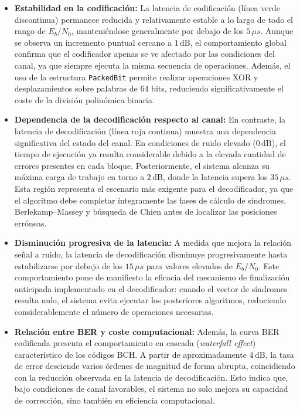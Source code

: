 \begin{itemize}

    \item \textbf{Estabilidad en la codificación:}  
    La latencia de codificación (línea verde discontinua) permanece reducida y relativamente estable a lo largo de todo el rango de $E_b/N_0$, manteniéndose generalmente por debajo de los $5\,\mu s$. Aunque se observa un incremento puntual cercano a $1\,\text{dB}$, el comportamiento global confirma que el codificador apenas se ve afectado por las condiciones del canal, ya que siempre ejecuta la misma secuencia de operaciones. Además, el uso de la estructura \texttt{PackedBit} permite realizar operaciones XOR y desplazamientos sobre palabras de 64 bits, reduciendo significativamente el coste de la división polinómica binaria.
    \item \textbf{Dependencia de la decodificación respecto al canal:}  
    En contraste, la latencia de decodificación (línea roja continua) muestra una dependencia significativa del estado del canal. En condiciones de ruido elevado ($0\,\text{dB}$), el tiempo de ejecución ya resulta considerable debido a la elevada cantidad de errores presentes en cada bloque. Posteriormente, el sistema alcanza su máxima carga de trabajo en torno a $2\,\text{dB}$, donde la latencia supera los $35\,\mu s$. Esta región representa el escenario más exigente para el decodificador, ya que el algoritmo debe completar íntegramente las fases de cálculo de síndromes, Berlekamp--Massey y búsqueda de Chien antes de localizar las posiciones erróneas.

    \item \textbf{Disminución progresiva de la latencia:}  
    A medida que mejora la relación señal a ruido, la latencia de decodificación disminuye progresivamente hasta estabilizarse por debajo de los $15\,\mu s$ para valores elevados de $E_b/N_0$. Este comportamiento pone de manifiesto la eficacia del mecanismo de finalización anticipada implementado en el decodificador: cuando el vector de síndromes resulta nulo, el sistema evita ejecutar los posteriores algoritmos, reduciendo considerablemente el número de operaciones necesarias.

    \item \textbf{Relación entre BER y coste computacional:}  
    Además, la curva BER codificada presenta el comportamiento en cascada (\textit{waterfall effect}) característico de los códigos BCH. A partir de aproximadamente $4\,\text{dB}$, la tasa de error desciende varios órdenes de magnitud de forma abrupta, coincidiendo con la reducción observada en la latencia de decodificación. Esto indica que, bajo condiciones de canal favorables, el sistema no solo mejora su capacidad de corrección, sino también su eficiencia computacional.

\end{itemize}

